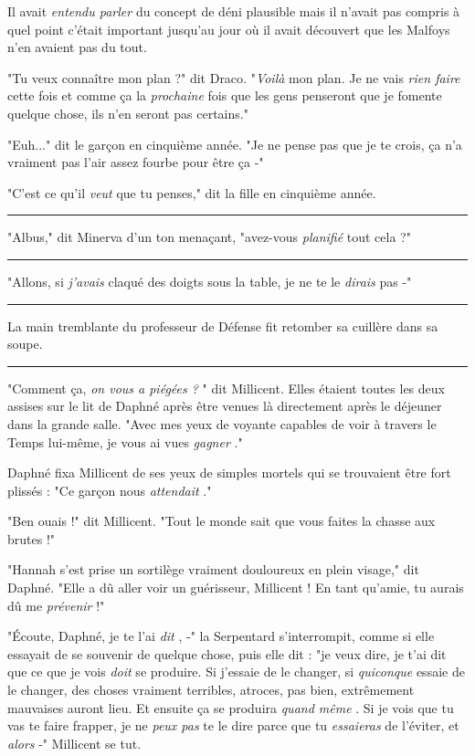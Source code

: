 Il avait \emph{entendu parler}  du concept de déni plausible mais il n'avait pas compris à quel point c'était important jusqu'au jour où il avait découvert que les Malfoys n'en avaient pas du tout.

"Tu veux connaître mon plan ?" dit Draco. "\emph{Voilà}  mon plan. Je ne vais \emph{rien faire}  cette fois et comme ça la \emph{prochaine}  fois que les gens penseront que je fomente quelque chose, ils n'en seront pas certains."

"Euh..." dit le garçon en cinquième année. "Je ne pense pas que je te crois, ça n'a vraiment pas l'air assez fourbe pour être ça -"

"C'est ce qu'il \emph{veut}  que tu penses," dit la fille en cinquième année.
\par\noindent\rule{\textwidth}{0.4pt}
"Albus," dit Minerva d'un ton menaçant, "avez-vous \emph{planifié}  tout cela ?"
\par\noindent\rule{\textwidth}{0.4pt}
"Allons, si \emph{j'avais}  claqué des doigts sous la table, je ne te le \emph{dirais}  pas -"
\par\noindent\rule{\textwidth}{0.4pt}
La main tremblante du professeur de Défense fit retomber sa cuillère dans sa soupe.
\par\noindent\rule{\textwidth}{0.4pt}
"Comment ça, \emph{on vous a piégées ?} " dit Millicent. Elles étaient toutes les deux assises sur le lit de Daphné après être venues là directement après le déjeuner dans la grande salle. "Avec mes yeux de voyante capables de voir à travers le Temps lui-même, je vous ai vues \emph{gagner} ."

Daphné fixa Millicent de ses yeux de simples mortels qui se trouvaient être fort plissés : "Ce garçon nous \emph{attendait} ."

"Ben ouais !" dit Millicent. "Tout le monde sait que vous faites la chasse aux brutes !"

"Hannah s'est prise un sortilège vraiment douloureux en plein visage," dit Daphné. "Elle a dû aller voir un guérisseur, Millicent ! En tant qu'amie, tu aurais dû me \emph{prévenir } !"

"Écoute, Daphné, je te l'ai \emph{dit} , -" la Serpentard s'interrompit, comme si elle essayait de se souvenir de quelque chose, puis elle dit : "je veux dire, je t'ai dit que ce que je vois \emph{doit}  se produire. Si j'essaie de le changer, si \emph{quiconque}  essaie de le changer, des choses vraiment terribles, atroces, pas bien, extrêmement mauvaises auront lieu. Et ensuite ça se produira \emph{quand même} . Si je vois que tu vas te faire frapper, je ne \emph{peux pas}  te le dire parce que tu \emph{essaieras}  de l'éviter, et \emph{alors}  -" Millicent se tut.

